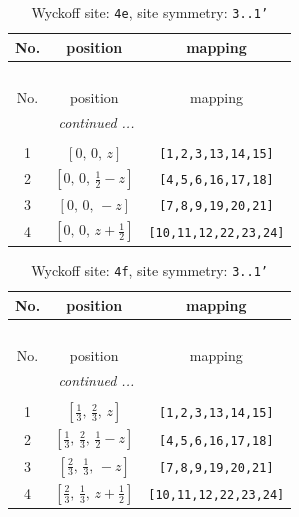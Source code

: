 \documentclass[fleqn,8pt]{jsarticle}
\begin{document}
\begin{longtable}{ccc}
\caption{Wyckoff site: {\tt 4e}, site symmetry: {\tt 3..1'}}
 \\
 \hline \hline
No. & position & mapping \\ \hline \endfirsthead

\multicolumn{2}{l}{\tablename\ \thetable{}} \\
 \hline \hline
No. & position & mapping \\ \hline \endhead

 \hline \hline
\multicolumn{2}{r}{\footnotesize\it continued ...} \\ \endfoot

 \hline \hline
\multicolumn{2}{r}{} \\ \endlastfoot

1 & $\left[ 0,\, 0,\, z \right]$ & {\tt [1,2,3,13,14,15]} \\ \hline
2 & $\left[ 0,\, 0,\, \frac{1}{2} - z \right]$ & {\tt [4,5,6,16,17,18]} \\ \hline
3 & $\left[ 0,\, 0,\, - z \right]$ & {\tt [7,8,9,19,20,21]} \\ \hline
4 & $\left[ 0,\, 0,\, z + \frac{1}{2} \right]$ & {\tt [10,11,12,22,23,24]} \\
\end{longtable}
\renewcommand{\arraystretch}{1.2}
\begin{longtable}{ccc}
\caption{Wyckoff site: {\tt 4f}, site symmetry: {\tt 3..1'}}
 \\
 \hline \hline
No. & position & mapping \\ \hline \endfirsthead

\multicolumn{2}{l}{\tablename\ \thetable{}} \\
 \hline \hline
No. & position & mapping \\ \hline \endhead

 \hline \hline
\multicolumn{2}{r}{\footnotesize\it continued ...} \\ \endfoot

 \hline \hline
\multicolumn{2}{r}{} \\ \endlastfoot

1 & $\left[ \frac{1}{3},\, \frac{2}{3},\, z \right]$ & {\tt [1,2,3,13,14,15]} \\ \hline
2 & $\left[ \frac{1}{3},\, \frac{2}{3},\, \frac{1}{2} - z \right]$ & {\tt [4,5,6,16,17,18]} \\ \hline
3 & $\left[ \frac{2}{3},\, \frac{1}{3},\, - z \right]$ & {\tt [7,8,9,19,20,21]} \\ \hline
4 & $\left[ \frac{2}{3},\, \frac{1}{3},\, z + \frac{1}{2} \right]$ & {\tt [10,11,12,22,23,24]} \\
\end{longtable}
\end{document}

